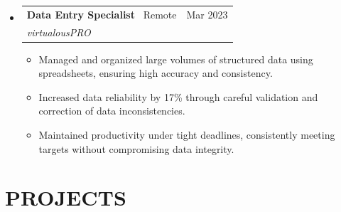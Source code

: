 \documentclass[11pt,a4paper]{article}
\makeatletter
\newcommand{\resumeSubheading}[5]{
  \vspace{2pt}
  \item[]
    \begin{tabular*}{\textwidth}[t]{l@{\extracolsep{\fill}}r}
      \textbf{#1} \textnormal{ \textbar\ #4} & #2 \\ %
      \textit{#3} & \\ %
    \end{tabular*}
    #5
  \vspace{-8pt}
}
\makeatother
\begin{document}
\begin{itemize}[leftmargin=0pt, label={}]
\resumeSubheading
  {Data Entry Specialist}{Mar 2023}
  {virtualousPRO}{Remote}
  {
  \begin{itemize}[leftmargin=15pt, label=\textbullet]
    \item Managed and organized large volumes of structured data using spreadsheets, ensuring high accuracy and consistency.
    \item Increased data reliability by 17\% through careful validation and correction of data inconsistencies.
    \item Maintained productivity under tight deadlines, consistently meeting targets without compromising data integrity.
  \end{itemize}
  }

\end{itemize}

\vspace{-8pt}

\section{PROJECTS}
\end{document}
